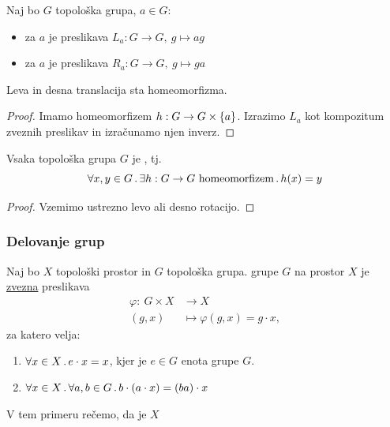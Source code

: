 \begin{definicija}
    Naj bo \(G\) topološka grupa, \(a \in G\):
    \begin{itemize}
        \item {} za \(a\) je preslikava \(L_a: G \to G, \ g \mapsto ag\)
        \item {} za \(a\) je preslikava \(R_a: G \to G, \ g \mapsto ga\)
    \end{itemize}
\end{definicija}

\begin{trditev}
    Leva in desna translacija sta homeomorfizma.
\end{trditev}

\begin{proof}
    Imamo homeomorfizem \(h: G \to G \times \left\{a\right\}\). Izrazimo \(L_a\) kot kompozitum zveznih preslikav in izračunamo njen inverz.
\end{proof}

\begin{posledica}
    Vsaka topološka grupa \(G\) je , tj.
    \[\forall x, y \in G \,.\, \exists h: G \to G \ \text{homeomorfizem} \,.\, h(x) = y\]
\end{posledica}

\begin{proof}
    Vzemimo ustrezno levo ali desno rotacijo.
\end{proof}

\subsubsection*{Delovanje grup}
\begin{definicija}
    Naj bo \(X\) topološki prostor in \(G\) topološka grupa.  grupe \(G\) na prostor \(X\) je \underline{zvezna} preslikava
    \begin{align*}
        \varphi: \ G \times X &\longrightarrow X \\
        (g, x) &\longmapsto \varphi(g,x) = g \cdot x,
    \end{align*}
    za katero velja:
    \begin{enumerate}
        \item \(\forall x \in X \,.\, e \cdot x = x\), kjer je \(e \in G\) enota grupe \(G\).
        \item \(\forall x \in X \,.\, \forall a, b \in G \,.\, b\cdot(a \cdot x) = (ba) \cdot x\)
    \end{enumerate}
    V tem primeru rečemo, da je \(X\) 
\end{definicija}


